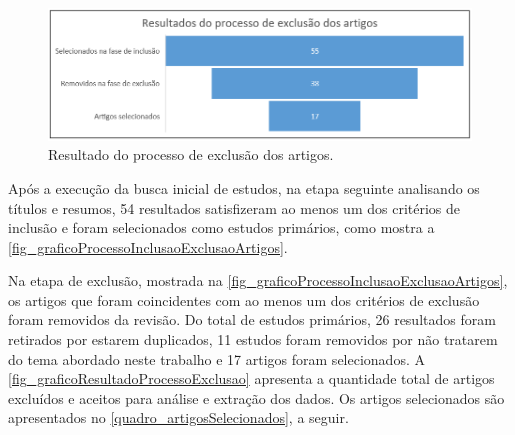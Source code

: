 \begin{figure}[htb]
	\caption{\label{fig_graficoResultadoProcessoExclusao}Resultado do processo de exclusão dos artigos.}
	\begin{center}
	    \includegraphics[scale=0.6]{Imagens/grafico - resultado da fase de exclusao dos artigos.png}
	\end{center}
\end{figure}

Após a execução da busca inicial de estudos, na etapa seguinte analisando os títulos e resumos, 54 resultados satisfizeram ao menos um dos critérios de inclusão e foram selecionados como estudos primários, como mostra a \autoref{fig_graficoProcessoInclusaoExclusaoArtigos}. 
\newline
\newline

Na etapa de exclusão, mostrada na \autoref{fig_graficoProcessoInclusaoExclusaoArtigos}, os artigos que foram coincidentes com ao menos um dos critérios de exclusão foram removidos da revisão. Do total de estudos primários, 26 resultados foram retirados por estarem duplicados, 11 estudos foram removidos por não tratarem do tema abordado neste trabalho e 17 artigos foram selecionados. A \autoref{fig_graficoResultadoProcessoExclusao} apresenta a quantidade total de artigos excluídos e aceitos para análise e extração dos dados. Os artigos selecionados são apresentados no \autoref{quadro_artigosSelecionados}, a seguir.

